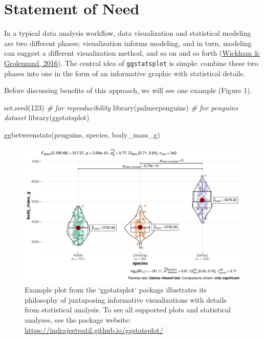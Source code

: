 \documentclass[10pt,a4paper,onecolumn]{article}
\newenvironment{Shaded}{\begin{snugshade}}{\end{snugshade}}
\newcommand{\CommentTok}[1]{\textcolor[rgb]{0.56,0.35,0.01}{\textit{#1}}}
\newcommand{\DecValTok}[1]{\textcolor[rgb]{0.00,0.00,0.81}{#1}}
\newcommand{\FunctionTok}[1]{\textcolor[rgb]{0.00,0.00,0.00}{#1}}
\newcommand{\NormalTok}[1]{#1}
\begin{document}
\hypertarget{statement-of-need}{%
\section{Statement of Need}\label{statement-of-need}}

In a typical data analysis workflow, data visualization and statistical
modeling are two different phases: visualization informs modeling, and
in turn, modeling can suggest a different visualization method, and so
on and so forth (\protect\hyperlink{ref-wickham2016r}{Wickham \&
Grolemund, 2016}). The central idea of \texttt{ggstatsplot} is simple:
combine these two phases into one in the form of an informative graphic
with statistical details.

Before discussing benefits of this approach, we will see one example
(Figure 1).

\begin{Shaded}
\begin{Highlighting}[]
\FunctionTok{set.seed}\NormalTok{(}\DecValTok{123}\NormalTok{) }\CommentTok{\# for reproducibility}
\FunctionTok{library}\NormalTok{(palmerpenguins) }\CommentTok{\# for \textquotesingle{}penguins\textquotesingle{} dataset}
\FunctionTok{library}\NormalTok{(ggstatsplot)}

\FunctionTok{ggbetweenstats}\NormalTok{(penguins, species, body\_mass\_g)}
\end{Highlighting}
\end{Shaded}

\begin{figure}
\includegraphics[width=1\linewidth]{paper_files/figure-latex/penguins-1} \caption{Example plot from the `ggstatsplot` package illustrates its philosophy of juxtaposing informative visualizations with details from statistical analysis. To see all supported plots and statistical analyses, see the package website: \url{https://indrajeetpatil.github.io/ggstatsplot/}}\label{fig:penguins}
\end{figure}
\end{document}
